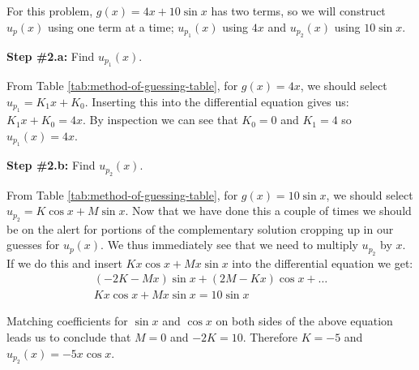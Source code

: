 \vspace{0.25cm}

\noindent For this problem, $g(x) = 4x+10\sin{x}$ has two terms, so we will construct $u_p(x)$ using one term at a time; $u_{p_1}(x)$ using $4x$ and $u_{p_2}(x)$ using $10\sin{x}$.  

\vspace{0.25cm}

\noindent\textbf{Step \#2.a:} Find $u_{p_1}(x)$.

\vspace{0.25cm}

\noindent From Table \ref{tab:method-of-guessing-table}, for $g(x)=4x$, we should select $u_{p_1} = K_1x+K_0$.  Inserting this into the differential equation gives us: $K_1x + K_0 = 4x$.  By inspection we can see that $K_0 = 0$ and $K_1 = 4$ so $u_{p_1}(x) = 4x$.  

\vspace{0.25cm}

\noindent\textbf{Step \#2.b: } Find $u_{p_2}(x)$.

\vspace{0.25cm}

\noindent From Table \ref{tab:method-of-guessing-table}, for $g(x)=10\sin{x}$, we should select $u_{p_2} =  K\cos{x}+M\sin{x}$. Now that we have done this a couple of times we should be on the alert for portions of the complementary solution cropping up in our guesses for $u_p(x)$. We thus immediately see that we need to multiply $u_{p_2}$ by $x$.  If we do this and insert $Kx\cos{x}+Mx\sin{x}$ into the differential equation we get:
\begin{multline*}
\left(-2K-Mx\right)\sin{x}+\left(2M-Kx\right)\cos{x} + \dots \\ Kx\cos{x}+Mx\sin{x} = 10\sin{x}
\end{multline*}

\vspace{0.20cm}

\noindent Matching coefficients for $\sin{x}$ and $\cos{x}$ on both sides of the above equation leads us to conclude that $M=0$ and $-2K = 10$.  Therefore $K = -5$ and $u_{p_2}(x)=-5x\cos{x}$.

